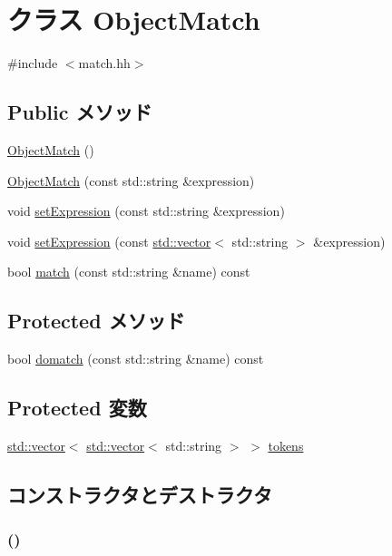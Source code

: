\hypertarget{classObjectMatch}{
\section{クラス ObjectMatch}
\label{classObjectMatch}
}


{\ttfamily \#include $<$match.hh$>$}\subsection*{Public メソッド}
\begin{DoxyCompactItemize}
\item 
\hyperlink{classObjectMatch_a6eb0719f6842c9924e1b040c03a51204}{ObjectMatch} ()
\item 
\hyperlink{classObjectMatch_a977996eb7a7dc9774a38bdce741bef81}{ObjectMatch} (const std::string \&expression)
\item 
void \hyperlink{classObjectMatch_aaafb5de2cb9659506c901bafcd628ce7}{setExpression} (const std::string \&expression)
\item 
void \hyperlink{classObjectMatch_a019c722622adbdaa35fb6764f447224f}{setExpression} (const \hyperlink{classstd_1_1vector}{std::vector}$<$ std::string $>$ \&expression)
\item 
bool \hyperlink{classObjectMatch_a4bf7f57ee970d2d7331d4ac65710bb66}{match} (const std::string \&name) const 
\end{DoxyCompactItemize}
\subsection*{Protected メソッド}
\begin{DoxyCompactItemize}
\item 
bool \hyperlink{classObjectMatch_a2f08a2a1bf9342fab98ef5e12dd0d685}{domatch} (const std::string \&name) const 
\end{DoxyCompactItemize}
\subsection*{Protected 変数}
\begin{DoxyCompactItemize}
\item 
\hyperlink{classstd_1_1vector}{std::vector}$<$ \hyperlink{classstd_1_1vector}{std::vector}$<$ std::string $>$ $>$ \hyperlink{classObjectMatch_a7e8524ce152410efd3043e8074899e97}{tokens}
\end{DoxyCompactItemize}


\subsection{コンストラクタとデストラクタ}
\hypertarget{classObjectMatch_a6eb0719f6842c9924e1b040c03a51204}{
\subsubsection[{ObjectMatch}]{ ()}}
\label{classObjectMatch_a6eb0719f6842c9924e1b040c03a51204}



